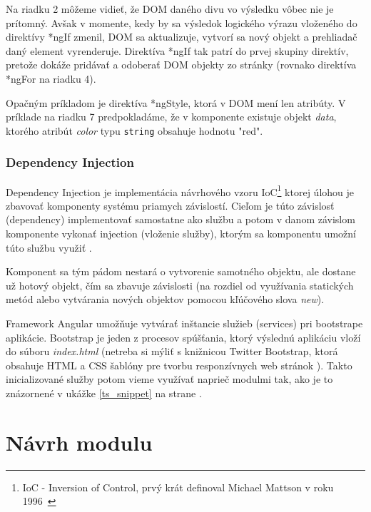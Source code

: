 \documentclass[
  digital, %
  twoside, %
  notable,   %
  nolof,   %
  nolot,   %
]{fithesis3}
\begin{document}
Na riadku 2 môžeme vidieť, že DOM daného divu vo výsledku vôbec nie je prítomný. Avšak v momente, kedy by sa výsledok logického výrazu vloženého do direktívy *ngIf zmenil, DOM sa aktualizuje, vytvorí sa nový objekt a prehliadač daný element vyrenderuje. Direktíva *ngIf tak patrí do prvej skupiny direktív, pretože dokáže pridávať a odoberať DOM objekty zo stránky (rovnako direktíva *ngFor na riadku 4).

Opačným príkladom je direktíva *ngStyle, ktorá v DOM mení len atribúty. V príklade na riadku 7 predpokladáme, že v komponente existuje objekt \textit{data}, ktorého atribút \textit{color} typu \texttt{string} obsahuje hodnotu "red".

\subsection{Dependency Injection}
\label{sec_di}
Dependency Injection je implementácia návrhového vzoru IoC\footnote{IoC - Inversion of Control, prvý krát definoval Michael Mattson v roku 1996~\cite{mattsson1996object}} ktorej úlohou je zbavovať komponenty systému priamych závislostí. Cieľom je túto závislosť (dependency) implementovať samostatne ako službu a potom v danom závislom komponente vykonať injection (vloženie služby), ktorým sa komponentu umožní túto službu využiť \cite{chiba2005aspect, yang2008empirical}.

Komponent sa tým pádom nestará o vytvorenie samotného objektu, ale dostane už hotový objekt, čím sa zbavuje závislosti (na rozdiel od využívania statických metód alebo vytvárania nových objektov pomocou kľúčového slova \textit{new}).

Framework Angular umožňuje vytvárať inštancie služieb (services) pri bootstrape aplikácie. Bootstrap je jeden z procesov spúšťania, ktorý výslednú aplikáciu vloží do súboru \textit{index.html} \cite{angular} (netreba si mýliť s knižnicou Twitter Bootstrap, ktorá obsahuje HTML a CSS šablóny pre tvorbu responzívnych web stránok \cite{peska2017thesis}). Takto inicializované služby potom vieme využívať naprieč modulmi tak, ako je to znázornené v ukážke \ref{ts_snippet} na strane \pageref{ts_snippet}.

\chapter{Návrh modulu}
\label{plan}
\end{document}
